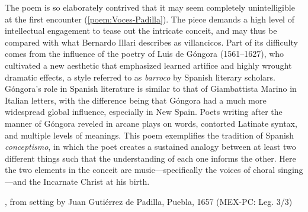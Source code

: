 The poem is so elaborately contrived that it may seem completely unintelligible
at the first encounter (\cref{poem:Voces-Padilla}).%
    \Autocites
    [37--38, 119--132]{Cashner:WLSCM32}
    [133--203]{Cashner:PhD}
The piece demands a high level of intellectual engagement to tease out the
intricate conceit, and may thus be compared with what Bernardo Illari describes
as  villancicos.%
    \Autocite[vol. 2, 304--308]{Illari:Polychoral}
Part of its difficulty comes from the influence of the poetry of Luis de Góngora
(1561--1627), who cultivated a new aesthetic that emphasized learned artifice
and highly wrought dramatic effects, a style referred to as \emph{barroco} by
Spanish literary scholars.%
    \Autocites
    [222--235]{Gaylord:Poetry}
    [vol. 1, 1014--1061]{Valbuena:Literatura}
Góngora's role in Spanish literature is similar to that of Giambattista Marino
in Italian letters, with the difference being that Góngora had a much more
widespread global influence, especially in New Spain.%
    \Autocite{Tenorio:Gongorismo}
Poets writing after the manner of Góngora reveled in arcane plays on words,
contorted Latinate syntax, and multiple levels of meanings.
This poem exemplifies the tradition of Spanish \emph{conceptismo}, in which the
poet creates a sustained analogy between at least two different things such that
the understanding of each one informs the other.
Here the two elements in the conceit are music---specifically the voices of
choral singing---and the Incarnate Christ at his birth.

\begin{poemexample}
    \caption{, from setting by Juan Gutiérrez
    de Padilla, Puebla, 1657 (MEX-PC: Leg. 3/3)}
    \label{poem:Voces-Padilla}
\end{poemexample}

